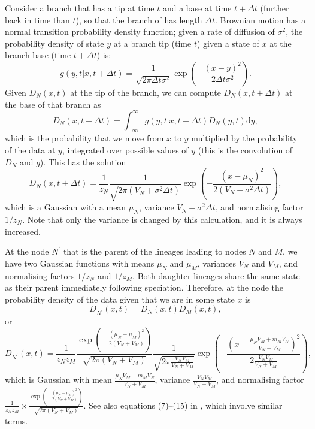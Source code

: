 \documentclass[12pt,twoside]{article}
\newcommand{\dnorm}[3]{%
  \frac{1}{\sqrt{2\pi #3}} 
  \exp\left(-\frac{(#1-#2)^2}{2#3}\right)
}
\newcommand{\ud}{\ensuremath{\mathrm{d}}}
\newcommand{\dt}{\ensuremath{\Delta t}}
\begin{document}
Consider a branch that has a tip at time $t$ and a base at time
$t+\dt$ (further back in time than $t$), so that the branch of has
length $\dt$.  Brownian motion has a normal transition probability
density function; given a rate of diffusion of $\sigma^2$, the
probability density of state $y$ at a branch tip (time $t$) given a
state of $x$ at the branch base (time $t+\dt$) is:
\begin{equation}
  \label{eq:xpdf-bm}
  g(y,t|x, t + \dt) = 
  \dnorm{x}{y}{\dt \sigma^2}.
\end{equation}
%
Given $D_N(x,t)$ at the tip of the branch, we can compute
$D_N(x,t+\dt)$ at the base of that branch as
\begin{equation}
  \label{eq:convolve}
  D_N(x,t+\dt) = 
  \int_{-\infty}^{\infty}
  g(y,t|x,t+\dt)
  D_N(y,t)\ud y,
\end{equation}
which is the probability that we move from $x$ to $y$ multiplied by
the probability of the data at $y$, integrated over possible values of
$y$ (this is the convolution of $D_N$ and $g$).
%
This has the solution
\begin{equation}
  \label{eq:convolve-bm-sol}
  D_N(x,t+\dt) = 
  \frac{1}{z_N}
  \dnorm{x}{\mu_N}{(V_N + \sigma^2\dt)},
\end{equation}
which is a Gaussian with a mean $\mu_N$, variance $V_N + \sigma^2\dt$, and
normalising factor $1/z_N$.  Note that only the variance is changed by
this calculation, and it is always increased.

At the node $N^\prime$ that is the parent of the lineages leading to
nodes $N$ and $M$, we have two Gaussian functions with means $\mu_N$
and $\mu_M$, variances $V_N$ and $V_M$, and normalising factors
$1/z_N$ and $1/z_M$.  Both daughter lineages share the same state as
their parent immediately following speciation.  Therefore, at the node
the probability density of the data given that we are in some state
$x$ is
\begin{equation}
  D_{N^\prime}(x,t) = D_N(x,t) D_M(x,t),
\end{equation}
or
\begin{equation}
  \label{eq:ic}
  D_{N^\prime}(x,t) = \frac{1}{z_Nz_M}
  \frac{\exp\left(-\frac{(\mu_N-\mu_M)^2}{2(V_N + V_M)}\right)}%
  {\sqrt{2\pi(V_N+V_M)}}
  \dnorm{x}{\frac{\mu_N V_M + m_M V_N}{V_N + V_M}}%
  {\frac{V_N  V_M}{V_N + V_M}},
\end{equation}
which is Gaussian with mean $\frac{\mu_N V_M + m_M V_N}{V_N + V_M}$,
variance $\frac{V_N V_M}{V_N + V_M}$, and normalising factor
$\frac{1}{z_Nz_M} \times \frac{\exp\left(-\frac{(\mu_N-\mu_M)^2}{2(V_N
      + V_M)}\right)}%
{\sqrt{2\pi(V_N+V_M)}}$.  See also equations (7)--(15) in
\citet{Felsenstein-1973-471}, which involve similar terms.
\end{document}
